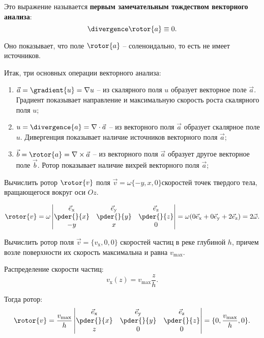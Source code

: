 	Это выражение называется \textbf{первым замечательным тождеством векторного анализа}:
	\[ \divergence\rotor{a} \equiv 0. \]
	
	Оно показывает, что поле \( \rotor{a} \) -- соленоидально, то есть не имеет источников.
	
	Итак, три основных операции векторного анализа:
	\begin{enumerate}
	\item \( \vec{a} = \gradient{u} = \nabla u \) -- из скалярного поля \( u \) образует векторное поле \( \vec{a} \).  Градиент показывает направление и максимальную скорость роста скалярного поля \( u \);
	\item \( u = \divergence{a} = \nabla\cdot\vec{a} \) -- из векторного поля \( \vec{a} \) образует скалярное поле \( u \).  Дивергенция показывает наличие источников векторного поля \( \vec{a} \);
	\item \( \vec{b} = \rotor{a} = \nabla\times\vec{a} \) -- из векторного поля \( \vec{a} \) образует другое векторное поле \( \vec{b} \).  Ротор показывает наличие вихрей векторного поля \( \vec{a} \);
	\end{enumerate}

	\begin{example}
	Вычислить ротор \( \rotor{v} \) поля \( \vec{v} = \omega\{-y, x, 0\} \)скоростей точек твердого тела, вращающегося вокруг оси \( Oz \).
	\end{example}
	
	\begin{solution}
	
	\[ \rotor{v} = \omega \begin{vmatrix}
	\vec{e}_\mathrm{x} & \vec{e}_\mathrm{y} & \vec{e}_\mathrm{z} \\
	\pder{}{x} & \pder{}{y} & \pder{}{z} \\
	-y & x & 0
	\end{vmatrix} = \omega(0\vec{e}_\mathrm{x} + 0\vec{e}_\mathrm{y} + 2\vec{e}_\mathrm{z}) = 2\vec{\omega}. \]
	\end{solution}
	
	\begin{example}
	Вычислить ротор поля \( \vec{v} = \{v_\mathrm{x}, 0, 0\} \) скоростей частиц в реке глубиной \( h \), причем возле поверхности их скорость максимальна и равна \( v_\mathrm{max} \).
	\end{example}
	
	\begin{solution}
	
	Распределение скорости частиц:
	\[ v_\mathrm{x}(z) = v_\mathrm{max} \frac{z}{h}. \]
	
	Тогда ротор:
	\[ \rotor{v} = \frac{v_\mathrm{max}}{h} \begin{vmatrix}
	\vec{e}_\mathrm{x} & \vec{e}_\mathrm{y} & \vec{e}_\mathrm{z} \\
	\pder{}{x} & \pder{}{y} & \pder{}{z} \\
	z & 0 & 0
	\end{vmatrix} = \{ 0, \frac{v_\mathrm{max}}{h}, 0 \}. \]
	\end{solution}

